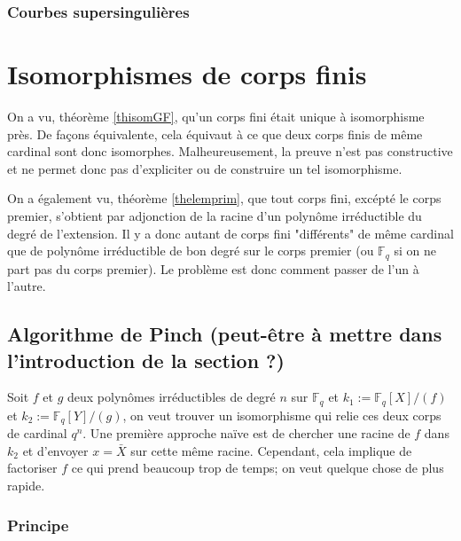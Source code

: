\documentclass[a4paper]{article} %
\numberwithin{equation}{section}
\newcommand\GF[1]{\mathbb{F}_{#1}}
\begin{document}
\subsubsection{Courbes supersingulières}

\section{Isomorphismes de corps finis}
On a vu, théorème \ref{thisomGF}, qu'un corps fini était unique à isomorphisme
près. De façons équivalente, cela équivaut à ce que deux corps finis de même
cardinal sont donc isomorphes. Malheureusement, la preuve n'est pas constructive
et ne permet donc pas d'expliciter ou de construire un tel isomorphisme.\par
On a également vu, théorème \ref{thelemprim}, que tout corps fini, excépté le 
corps premier, s'obtient par adjonction de la racine d'un polynôme irréductible
du degré de l'extension. Il y a donc autant de corps fini "différents" de même
cardinal que de polynôme irréductible de bon degré sur le corps premier (ou 
$\GF{q}$ si on ne part pas du corps premier). Le problème est donc comment 
passer de l'un à l'autre.\par

\subsection{Algorithme de Pinch (peut-être à mettre dans l'introduction de 
la section ?)}
Soit $f$ et $g$ deux polynômes irréductibles de degré $n$ sur $\GF{q}$ et 
$k_1 := \GF{q}[X]/(f)$ et $k_2 := \GF{q}[Y]/(g)$, on veut trouver un 
isomorphisme qui relie ces deux corps de cardinal $q^n$. Une première approche 
naïve est de chercher une racine de $f$ dans $k_2$ et d'envoyer $x = \bar{X}$
sur cette même racine. Cependant, cela implique de factoriser $f$ ce qui prend
beaucoup trop de temps; on veut quelque chose de plus rapide.

\subsubsection{Principe}
\end{document}
